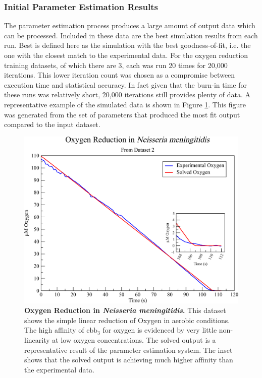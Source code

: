 \subsubsection{Initial Parameter Estimation Results}
The parameter estimation process produces a large amount of output data which can be processed. Included in these data are the best simulation results from each run. Best is defined here as the simulation with the best goodness-of-fit, i.e. the one with the closest match to the experimental data. For the oxygen reduction training datasets, of which there are 3, each was run 20 times for 20,000 iterations. This lower iteration count was chosen as a compromise between execution time and statistical accuracy. In fact given that the burn-in time for these runs was relatively short, 20,000 iterations still provides plenty of data. A representative example of the simulated data is shown in Figure \ref{fig:o2sim}. This figure was generated from the set of parameters that produced the most fit output compared to the input dataset.

\begin{figure}[p]
 \centering
 \includegraphics[width=14cm]{./05-oxygenreduction/data/o2sim.pdf}
 \caption[{Oxygen Reduction in \textit{Neisseria meningitidis}.}]{{\bf Oxygen Reduction in \textit{Neisseria meningitidis}.} This dataset shows the simple linear reduction of Oxygen in aerobic conditions. The high affinity of $\mathrm{cbb}_3$ for oxygen is evidenced by very little non-linearity at low oxygen concentrations. The solved output is a representative result of the parameter estimation system. The inset shows that the solved output is achieving much higher affinity than the experimental data.
 \label{fig:o2sim}}
\end{figure}
\afterpage{\clearpage}


